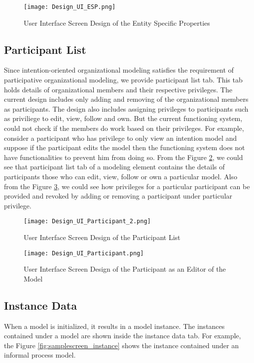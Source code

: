 \begin{figure} [H]
	\centering
	\texttt{[image: Design\_UI\_ESP.png]}
	\caption{User Interface Screen Design of the Entity Specific Properties}
	\label{fig:samplescreen_esp}
\end{figure}

\subsection{Participant List}
Since intention-oriented organizational modeling satisfies the requirement of participative organizational modeling, we provide participant list tab. This tab holds details of organizational members and their respective privileges. The current design includes only adding and removing of the organizational members as participants. The design also includes assigning privileges to participants such as priviliege to edit, view, follow and own. But the current functioning system, could not check if the members do work based on their privileges. For example, consider a participant who has privilege to only view an intention model and suppose if the participant edits the model then the functioning system does not have functionalities to prevent him from doing so. From the Figure \ref{fig:samplescreen_pl}, we could see that participant list tab of a modeling element contains the details of participants those who can edit, view, follow or own a particular model. Also from the Figure \ref{fig:samplescreen_pl_editor}, we could see how privileges for a particular participant can be provided and revoked by adding or removing a participant under particular privilege.  
\begin{figure} [H]
	\centering
	\texttt{[image: Design\_UI\_Participant\_2.png]}
	\caption{User Interface Screen Design of the Participant List}
	\label{fig:samplescreen_pl}
\end{figure}

\begin{figure} [H]
	\centering
	\texttt{[image: Design\_UI\_Participant.png]}
	\caption{User Interface Screen Design of the Participant as an Editor of the Model}
	\label{fig:samplescreen_pl_editor}
\end{figure}

\subsection{Instance Data}
When a model is initialized, it results in a model instance. The instances contained under a model are shown inside the instance data tab. For example, the Figure \ref{fig:samplescreen_instance} shows the instance contained under an informal process model. 
  

